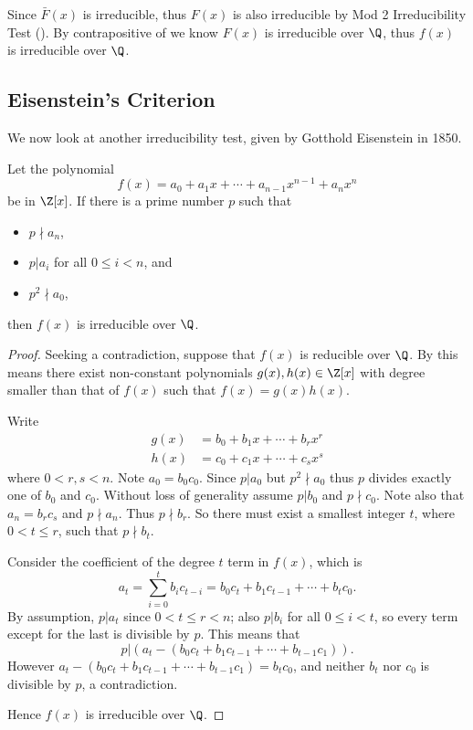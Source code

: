 \begin{example}
    Since $\bar{F}(x)$ is irreducible, thus $F(x)$ is also irreducible by Mod 2 Irreducibility Test (). By contrapositive of  we know $F(x)$ is irreducible over $\Q$, thus $f(x)$ is irreducible over $\Q$.
\end{example}

\subsection{Eisenstein's Criterion}
We now look at another irreducibility test, given by Gotthold Eisenstein in 1850.

\begin{theorem}\label{thrm-eisenstein-criterion}
    Let the polynomial
    \[
        f(x) = a_0 + a_1x + \cdots + a_{n-1}x^{n-1} + a_nx^n
    \]
    be in $\Z[x]$. If there is a prime number $p$ such that
    \begin{itemize}
        \item $p \nmid a_n$,
        \item $p \vert a_i$ for all $0 \leq i < n$, and
        \item $p^2 \nmid a_0$,
    \end{itemize}
    then $f(x)$ is irreducible over $\Q$.
\end{theorem}
\begin{proof}
    Seeking a contradiction, suppose that $f(x)$ is reducible over $\Q$. By  this means there exist non-constant polynomials $g(x),h(x) \in \Z[x]$ with degree smaller than that of $f(x)$ such that $f(x) = g(x)h(x)$.

    Write
    \begin{align*}
        g(x) &= b_0 + b_1x + \cdots + b_rx^r\\
        h(x) &= c_0 + c_1x + \cdots + c_sx^s
    \end{align*}
    where $0 < r, s < n$. Note $a_0 = b_0c_0$. Since $p \vert a_0$ but $p^2 \nmid a_0$ thus $p$ divides exactly one of $b_0$ and $c_0$. Without loss of generality assume $p \vert b_0$ and $p \nmid c_0$. Note also that $a_n = b_rc_s$ and $p \nmid a_n$. Thus $p \nmid b_r$. So there must exist a smallest integer $t$, where $0 < t \leq r$, such that $p \nmid b_t$.

    Consider the coefficient of the degree $t$ term in $f(x)$, which is
    \[
        a_t = \sum_{i=0}^tb_ic_{t-i} = b_0c_t + b_1c_{t-1} + \cdots + b_tc_0.
    \]
    By assumption, $p \vert a_t$ since $0 < t \leq r < n$; also $p \vert b_i$ for all $0 \leq i < t$, so every term except for the last is divisible by $p$. This means that
    \[
        p \vert (a_t - (b_0c_t + b_1c_{t-1} + \cdots + b_{t-1}c_1)).
    \]
    However $a_t - (b_0c_t + b_1c_{t-1} + \cdots + b_{t-1}c_1) = b_tc_0$, and neither $b_t$ nor $c_0$ is divisible by $p$, a contradiction.

    Hence $f(x)$ is irreducible over $\Q$.
\end{proof}


